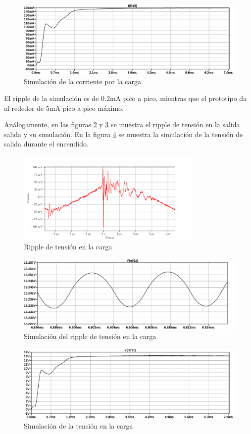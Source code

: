 \begin{figure}[H]
    \centering
    \includegraphics[width=\textwidth]{images/sim/14.pdf}
    \caption{Simulación de la corriente por la carga}
    \label{fig:sim:14}
\end{figure}

El ripple de la simulación es de 0.2mA pico a pico, mientras que el prototipo da al rededor de 5mA pico a pico máximo.

Análogamente, en las figuras \ref{fig:osc:58} y \ref{fig:sim:21ripple} se muestra el ripple de tensión en la salida salida y su simulación. En la figura \ref{fig:sim:21} se muestra la simulación de la tensión de salida durante el encendido.

\begin{figure}[H]
    \centering
    \includegraphics[width=0.8\textwidth]{images/capturas-osciloscopio/17-11-2022/58.png}
    \caption{Ripple de tensión en la carga}
    \label{fig:osc:58}
\end{figure}

\begin{figure}[H]
    \centering
    \includegraphics[width=\textwidth]{images/sim/21-ripple.pdf}
    \caption{Simulación del ripple de tensión en la carga}
    \label{fig:sim:21ripple}
\end{figure}

\begin{figure}[H]
    \centering
    \includegraphics[width=\textwidth]{images/sim/21.pdf}
    \caption{Simulación de la tensión en la carga}
    \label{fig:sim:21}
\end{figure}
